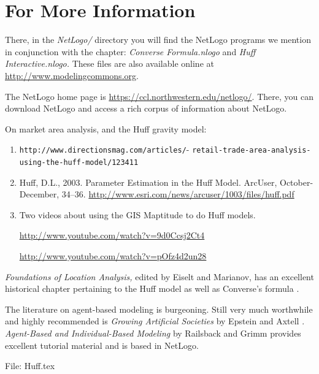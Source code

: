 \section{For More Information}



\noindent There, in the {\it NetLogo/} directory you will find the NetLogo programs we mention in conjunction with the chapter: {\it Converse Formula.nlogo} and {\it Huff Interactive.nlogo.} These files are also available online at \url{http://www.modelingcommons.org}.

The NetLogo home page is \url{https://ccl.northwestern.edu/netlogo/}. There, you can download NetLogo and access a rich corpus of information about NetLogo.

On market area analysis, and the Huff gravity model:
\begin{enumerate}
\item {\tt http://www.directionsmag.com/articles/}-\newline
{\tt retail-trade-area-analysis-using-the-huff-model/123411}
\item Huff, D.L., 2003. Parameter Estimation in the Huff Model. ArcUser, October-December, 34--36.
\url{http://www.esri.com/news/arcuser/1003/files/huff.pdf}
\item Two videos about using the GIS Maptitude to do Huff models.

\url{http://www.youtube.com/watch?v=9d0Ccsj2Ct4}

\url{http://www.youtube.com/watch?v=pOfz4d2un28}
\end{enumerate}

%

{\it Foundations of Location Analysis,}  edited by Eiselt and Marianov, has an excellent historical chapter pertaining to the Huff model as well as Converse's formula \cite[Chapter 18]{eiselt_marianov_eds_2011}.

The literature on agent-based modeling is burgeoning. Still very much worthwhile and highly recommended is {\it Growing Artificial Societies} by Epstein and Axtell \cite{epstein_axtell_1996}.
{\it Agent-Based and Individual-Based Modeling} by Railsback and Grimm \cite{railsback_gramm_netlogo_2012} provides excellent tutorial material and is based in NetLogo.

\ifnum{}
\vfill
\noindent File: Huff.tex
\fi
